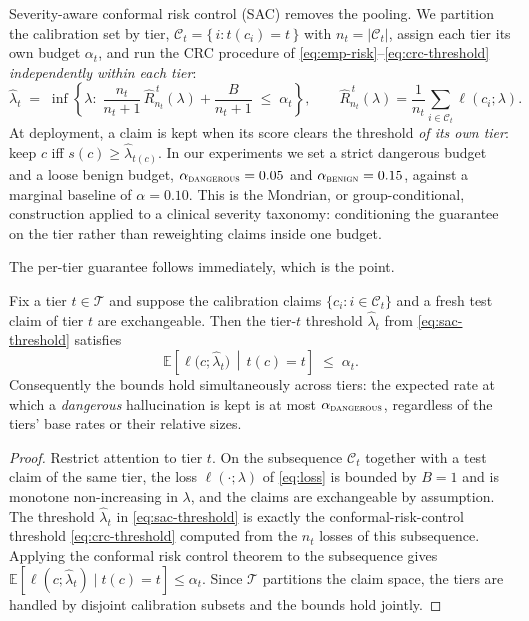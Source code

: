 \documentclass[11pt]{article}
\begin{document}
Severity-aware conformal risk control (SAC) removes the pooling. We partition the
calibration set by tier, $\mathcal{C}_t = \{\, i : t(c_i) = t \,\}$ with
$n_t = |\mathcal{C}_t|$, assign each tier its own budget $\alpha_t$, and run the
CRC procedure of \eqref{eq:emp-risk}--\eqref{eq:crc-threshold} \emph{independently
within each tier}:
\begin{equation}
\widehat{\lambda}_t \;=\; \inf\left\{ \lambda :\;
\frac{n_t}{n_t+1}\,\widehat{R}_{n_t}^{\,t}(\lambda) + \frac{B}{n_t+1}
\;\le\; \alpha_t \right\},
\qquad
\widehat{R}_{n_t}^{\,t}(\lambda) = \frac{1}{n_t}\!\sum_{i \in \mathcal{C}_t}
\ell(c_i; \lambda).
\label{eq:sac-threshold}
\end{equation}
At deployment, a claim is kept when its score clears the threshold \emph{of its own
tier}: keep $c$ iff $s(c) \ge \widehat{\lambda}_{t(c)}$. In our experiments we set a
strict dangerous budget and a loose benign budget, $\alpha_{\textsc{dangerous}} =
0.05$ and $\alpha_{\textsc{benign}} = 0.15$, against a marginal baseline of
$\alpha = 0.10$. This is the Mondrian, or group-conditional, construction
\citep{vovk2012conditional} applied to a clinical severity taxonomy: conditioning
the guarantee on the tier rather than reweighting claims inside one budget.

The per-tier guarantee follows immediately, which is the point.

\begin{proposition}
\label{prop:sac}
Fix a tier $t \in \mathcal{T}$ and suppose the calibration claims
$\{c_i : i \in \mathcal{C}_t\}$ and a fresh test claim of tier $t$ are
exchangeable. Then the tier-$t$ threshold $\widehat{\lambda}_t$ from
\eqref{eq:sac-threshold} satisfies
\begin{equation}
\mathbb{E}\!\left[\ell\big(c; \widehat{\lambda}_t\big) \,\middle|\, t(c) = t\right]
\;\le\; \alpha_t .
\end{equation}
Consequently the bounds hold simultaneously across tiers: the expected rate at
which a \emph{dangerous} hallucination is kept is at most
$\alpha_{\textsc{dangerous}}$, regardless of the tiers' base rates or their
relative sizes.
\end{proposition}

\begin{proof}
Restrict attention to tier $t$. On the subsequence $\mathcal{C}_t$ together with a
test claim of the same tier, the loss $\ell(\cdot; \lambda)$ of \eqref{eq:loss} is
bounded by $B = 1$ and is monotone non-increasing in $\lambda$, and the claims are
exchangeable by assumption. The threshold $\widehat{\lambda}_t$ in
\eqref{eq:sac-threshold} is exactly the conformal-risk-control threshold
\eqref{eq:crc-threshold} computed from the $n_t$ losses of this subsequence.
Applying the conformal risk control theorem \citep{angelopoulos2024crc} to the
subsequence gives $\mathbb{E}[\ell(c; \widehat{\lambda}_t) \mid t(c) = t] \le
\alpha_t$. Since $\mathcal{T}$ partitions the claim space, the tiers are handled by
disjoint calibration subsets and the bounds hold jointly.
\end{proof}
\end{document}
